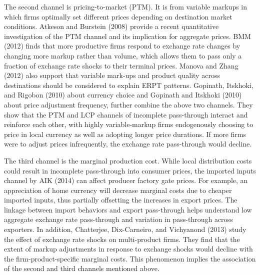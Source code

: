 The second channel is pricing-to-market (PTM). It is from variable markups in which firms optimally set different prices depending on destination market conditions. Atkeson and Burstein (2008)\cite{atkeson2008} provide a recent quantitative investigation of the PTM channel and its implication for aggregate prices. BMM (2012)\cite{bmm2012} finds that more productive firms respond to exchange rate changes by changing more markup rather than volume, which allows them to pass only a fraction of exchange rate shocks to their terminal prices. Manova and Zhang (2012)\cite{manova-zhang2012} also support that variable mark-ups and product quality across destinations should be considered to explain ERPT patterns. Gopinath, Itskhoki, and Rigobon (2010)\cite{gopinath2010-currency} about currency choice and Gopinath and Itskhoki (2010)\cite{gopinath2010-frequency} about price adjustment frequency, further combine the above two channels. They show that the PTM and LCP channels of incomplete pass-through interact and reinforce each other, with highly variable-markup firms endogenously choosing to price in local currency as well as adopting longer price durations. If more firms were to adjust prices infrequently, the exchange rate pass-through would decline.

The third channel is the marginal production cost.  While local distribution costs could result in incomplete pass-through into consumer prices, the imported inputs channel by AIK (2014)\cite{aik2014} can affect producer factory gate prices. For example, an appreciation of home currency will decrease marginal costs due to cheaper imported inputs, thus partially offsetting the increases in export prices. The linkage between import behaviors and export pass-through helps understand low aggregate exchange rate pass-through and variation in pass-through across exporters. In addition, Chatterjee, Dix-Carneiro, and Vichyanond (2013)\cite{chatterjee2013} study the effect of exchange rate shocks on multi-product firms. They find that the extent of markup adjustments in response to exchange shocks would decline with the firm-product-specific marginal costs. This phenomenon implies the association of the second and third channels mentioned above.

